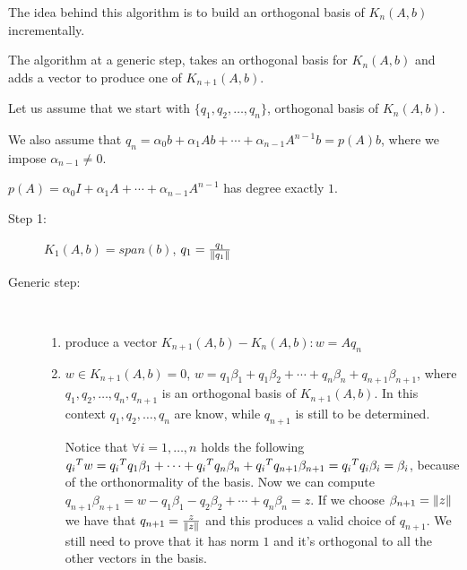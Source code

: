 \documentclass[ComputationalMathematics.tex]{subfiles}
\begin{document}
The idea behind this algorithm is to build an orthogonal basis of $K_n(A, b)$ incrementally.

The algorithm at a generic step, takes an orthogonal basis for $K_{n}(A, b)$ and adds a vector to produce one of $K_{n+1}(A, b)$.

Let us assume that we start with $\{q_1, q_2, \ldots, q_{n}\}$, orthogonal basis of $K_n(A, b)$.

We also assume that $q_n = \alpha_0 b + \alpha_1 Ab + \cdots + \alpha_{n-1}A^{n-1}b = p(A)b$, where we impose $\alpha_{n-1} \neq 0$.

$p(A) = \alpha_0 I + \alpha_1 A + \cdots + \alpha_{n-1} A^{n-1}$ has degree exactly $1$.

\begin{description}
  \item[{\sc Step 1:}] $K_1(A, b) = span(b)$, $q_1 = \frac{q_1}{\left\lVert q_1\right\rVert}$
  \item[{\sc Generic step:}]~\\
    \begin{enumerate}
      \item produce a vector $K_{n+1}(A, b) - K_n(A, b): w =Aq_n$
      \item $w \in K_{n+1}(A, b) = 0$, $w = q_1 \beta_1 + q_1 \beta_2 + \cdots + q_n \beta_n + q_{n+1} \beta_{n+1}$, where $q_1, q_2, \ldots, q_n, q_{n+1}$ is an orthogonal basis of $K_{n+1}(A, b)$. In this context $q_1, q_2, \ldots, q_n$ are know, while $q_{n+1}$ is still to be determined.

        Notice that $\forall i = 1, \ldots, n$ holds the following ${q_i}^{T} w = {q_i}^{T} q_1 \beta_1 + \cdots + {q_i}^{T} q_n \beta_n + {q_i}^{T} q_{n+1}\beta_{n+1} = {q_i}^{T} q_i \beta_i = \beta_i$, because of the orthonormality of the basis.
        Now we can compute $q_{n+1} \beta_{n+1} = w - q_1\beta_1 - q_2 \beta_2 + \cdots + q_n \beta_n = z$.
      If we choose $\beta_{n+1} =\left\lVert z\right\rVert$ we have that $q_{n+1} = \frac{z}{\left\lVert z\right\rVert}$ and this produces a valid choice of $q_{n+1}$. We still need to prove that it has norm $1$ and it's orthogonal to all the other vectors in the basis.
  \end{enumerate}
\end{description}
\end{document}
